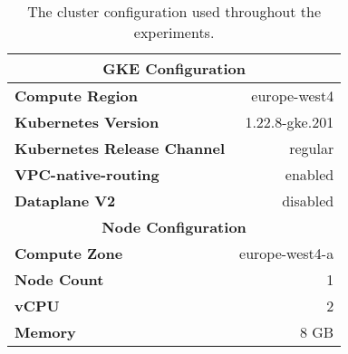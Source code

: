 \begin{table*}[!t]
\centering

\begin{tabular}{l r}


\toprule
\multicolumn{2}{c}{\textbf{GKE Configuration}}       \\
\toprule

\textbf{Compute Region}    & europe-west4            \\
\textbf{Kubernetes Version}& 1.22.8-gke.201          \\
\textbf{Kubernetes Release Channel} & regular        \\
\textbf{VPC-native-routing}         & enabled        \\
\textbf{Dataplane V2}               & disabled       \\

\toprule
\multicolumn{2}{c}{\textbf{Node Configuration}} \\
\toprule

\textbf{Compute Zone}               & europe-west4-a \\
\textbf{Node Count}                 & 1              \\
\textbf{vCPU}                       & 2              \\
\textbf{Memory}                     & 8 GB           \\  

\bottomrule

\end{tabular}


\caption[The cluster configuration used throughout the experiments.]{The cluster configuration used throughout the experiments.}
\label{tab:experiment:design:cluster-config}
\end{table*}